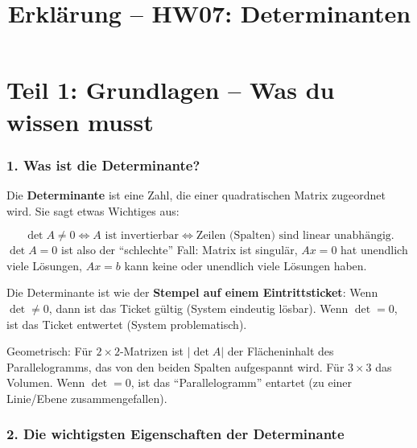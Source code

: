 \documentclass[a4paper,12pt]{article}
\title{Erkl\"arung -- HW07: Determinanten}
\author{}
\date{}
\begin{document}
\maketitle

\part*{Teil 1: Grundlagen -- Was du wissen musst}

\section*{1. Was ist die Determinante?}

Die \textbf{Determinante} ist eine Zahl, die einer quadratischen Matrix zugeordnet wird. Sie sagt etwas Wichtiges aus:

\begin{merkbox}[title={Kernaussage der Determinante}]
\[
\det A \neq 0 \iff A \text{ ist invertierbar} \iff \text{Zeilen (Spalten) sind linear unabh\"angig}.
\]
$\det A = 0$ ist also der ``schlechte'' Fall: Matrix ist singul\"ar, $Ax = 0$ hat unendlich viele L\"osungen, $Ax = b$ kann keine oder unendlich viele L\"osungen haben.
\end{merkbox}

\begin{analogie}
Die Determinante ist wie der \textbf{Stempel auf einem Eintrittsticket}: Wenn $\det \neq 0$, dann ist das Ticket g\"ultig (System eindeutig l\"osbar). Wenn $\det = 0$, ist das Ticket entwertet (System problematisch).

Geometrisch: F\"ur $2\times 2$-Matrizen ist $|\det A|$ der Fl\"acheninhalt des Parallelogramms, das von den beiden Spalten aufgespannt wird. F\"ur $3 \times 3$ das Volumen. Wenn $\det = 0$, ist das ``Parallelogramm'' entartet (zu einer Linie/Ebene zusammengefallen).
\end{analogie}

\section*{2. Die wichtigsten Eigenschaften der Determinante}
\end{document}
